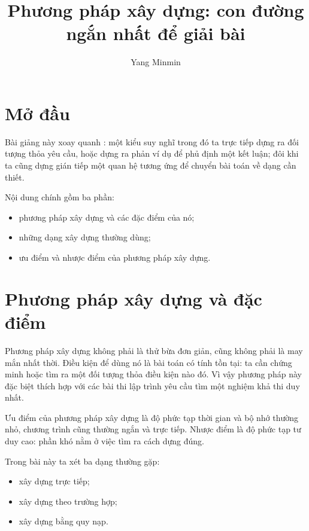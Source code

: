 \documentclass[11pt]{article}
\title{Phương pháp xây dựng: con đường ngắn nhất để giải bài}
\author{Yang Minmin}
\date{}
\begin{document}
\maketitle


\section{Mở đầu}

Bài giảng này xoay quanh : một kiểu suy nghĩ trong
đó ta trực tiếp dựng ra đối tượng thỏa yêu cầu, hoặc dựng ra phản ví dụ để phủ
định một kết luận; đôi khi ta cũng dựng gián tiếp một quan hệ tương ứng để
chuyển bài toán về dạng cần thiết.

Nội dung chính gồm ba phần:
\begin{itemize}
  \item phương pháp xây dựng và các đặc điểm của nó;
  \item những dạng xây dựng thường dùng;
  \item ưu điểm và nhược điểm của phương pháp xây dựng.
\end{itemize}

\section{Phương pháp xây dựng và đặc điểm}

Phương pháp xây dựng không phải là thử bừa đơn giản, cũng không phải là may
mắn nhất thời. Điều kiện để dùng nó là bài toán có tính tồn tại: ta cần chứng
minh hoặc tìm ra một đối tượng thỏa điều kiện nào đó. Vì vậy phương pháp này
đặc biệt thích hợp với các bài thi lập trình yêu cầu tìm một nghiệm khả thi
duy nhất.

Ưu điểm của phương pháp xây dựng là độ phức tạp thời gian và bộ nhớ thường
nhỏ, chương trình cũng thường ngắn và trực tiếp. Nhược điểm là độ phức tạp tư
duy cao: phần khó nằm ở việc tìm ra cách dựng đúng.

Trong bài này ta xét ba dạng thường gặp:
\begin{itemize}
  \item xây dựng trực tiếp;
  \item xây dựng theo trường hợp;
  \item xây dựng bằng quy nạp.
\end{itemize}
\end{document}
